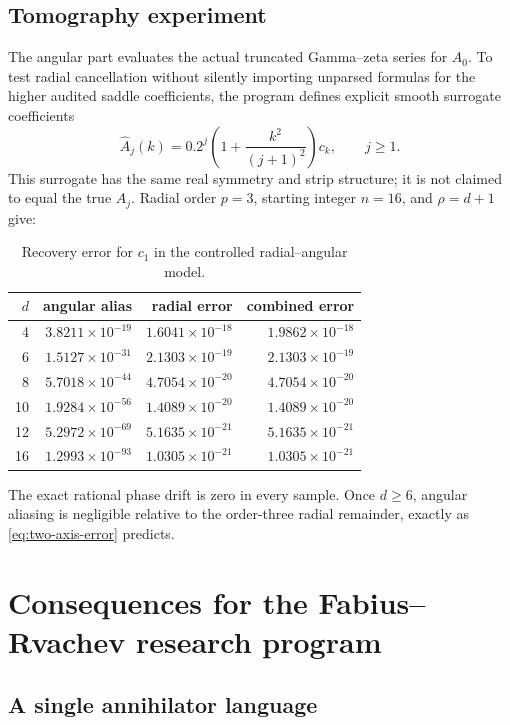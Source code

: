 \documentclass[11pt,oneside]{article}
\numberwithin{equation}{section}
\theoremstyle{definition}
\theoremstyle{remark}
\begin{document}
\subsection{Tomography experiment}

The angular part evaluates the actual truncated Gamma--zeta series for $A_0$.  To test
radial cancellation without silently importing unparsed formulas for the higher audited
saddle coefficients, the program defines explicit smooth surrogate coefficients
\[
 \widehat A_j(k)=0.2^j\left(1+\frac{k^2}{(j+1)^2}\right)c_k,
 \qquad j\ge1.
\]
This surrogate has the same real symmetry and strip structure; it is not claimed to equal
the true $A_j$.  Radial order $p=3$, starting integer $n=16$, and $\rho=d+1$ give:

\begin{table}[H]
\centering
\caption{Recovery error for $c_1$ in the controlled radial--angular model.}
\label{tab:tomography}
\begin{tabular}{rrrr}
\toprule
$d$ & angular alias & radial error & combined error\\
\midrule
4 & $3.8211\times10^{-19}$ & $1.6041\times10^{-18}$ & $1.9862\times10^{-18}$\\
6 & $1.5127\times10^{-31}$ & $2.1303\times10^{-19}$ & $2.1303\times10^{-19}$\\
8 & $5.7018\times10^{-44}$ & $4.7054\times10^{-20}$ & $4.7054\times10^{-20}$\\
10 & $1.9284\times10^{-56}$ & $1.4089\times10^{-20}$ & $1.4089\times10^{-20}$\\
12 & $5.2972\times10^{-69}$ & $5.1635\times10^{-21}$ & $5.1635\times10^{-21}$\\
16 & $1.2993\times10^{-93}$ & $1.0305\times10^{-21}$ & $1.0305\times10^{-21}$\\
\bottomrule
\end{tabular}
\end{table}

The exact rational phase drift is zero in every sample.  Once $d\ge6$, angular aliasing is
negligible relative to the order-three radial remainder, exactly as
\eqref{eq:two-axis-error} predicts.

\section{Consequences for the Fabius--Rvachev research program}
\label{sec:consequences}

\subsection{A single annihilator language}
\end{document}
